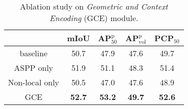 \documentclass[10pt,twocolumn,letterpaper]{article}
\begin{document}
\begin{table}[t]
\centering
\small
{}
\vspace{.5em}
  \caption{Ablation study on \emph{enlarging RoI resolution} (ERR) operation, the numbers in brackets are the RoI scales.}
  \label{tab:ablation_err}
\vspace{-.8em}
\end{table}


\begin{table}[t]
\centering
\small
\begin{tabular}{c|cccc}
& mIoU  &  AP$^\text{p}_\text{50}$ & AP$^\text{p}_\text{vol}$  & PCP$_\text{50}$ \\
 \toprule[0.2em]
baseline           & 50.7 & 47.9 & 47.6 & 49.7 \\
ASPP only        & 51.9 & 51.1 & 48.3 & 51.4 \\
Non-local only  & 50.5 & 47.0 & 47.6 & 48.9 \\
GCE                 & \textbf{52.7} & \textbf{53.2} & \textbf{49.7} & \textbf{52.6} \\

\end{tabular}
\vspace{.5em}
  \caption{Ablation study on \emph{Geometric and Context Encoding} (GCE) module.}
  \label{tab:ablation_gce}
\vspace{-.8em}
\end{table}
\end{document}
